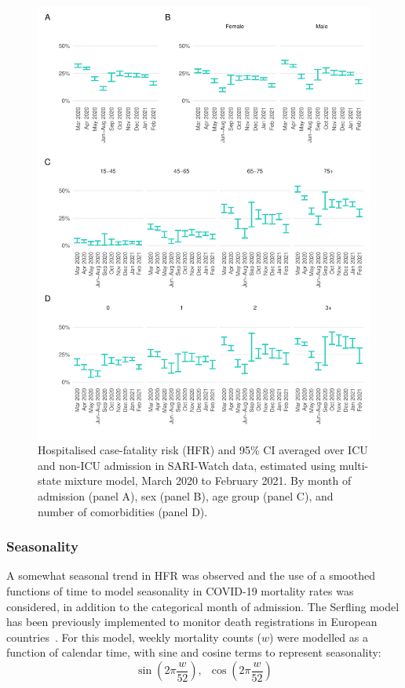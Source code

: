 \begin{figure}[htbp!]
    \centering
    \includegraphics[width=\textwidth]{sari_hfr.pdf}
    \caption[Hospitalised case-fatality risk (HFR) averaged over ICU and non-ICU admission in SARI-Watch data estimated using multi-state mixture model, March 2020 to February 2021]{Hospitalised case-fatality risk (HFR) and 95\% CI averaged over ICU and non-ICU admission in SARI-Watch data, estimated using multi-state mixture model, March 2020 to February 2021. By month of admission (panel A), sex (panel B), age group (panel C), and number of comorbidities (panel D).}\label{fig:sari-hfr}
\end{figure}

\subsubsection{Seasonality}

A somewhat seasonal trend in HFR was observed and the use of a smoothed functions of time to model seasonality in COVID-19 mortality rates was considered, in addition to the categorical month of admission. The Serfling model has been previously implemented to monitor death registrations in European countries~\parencite{Nielsen2013-jh, Serfling1963-ju}. For this model, weekly mortality counts ($w$) were modelled as a function of calendar time, with sine and cosine terms to represent seasonality:
%
\[
    \sin(2\pi \frac{w}{52}), \enspace
    \cos(2\pi \frac{w}{52})
\]


